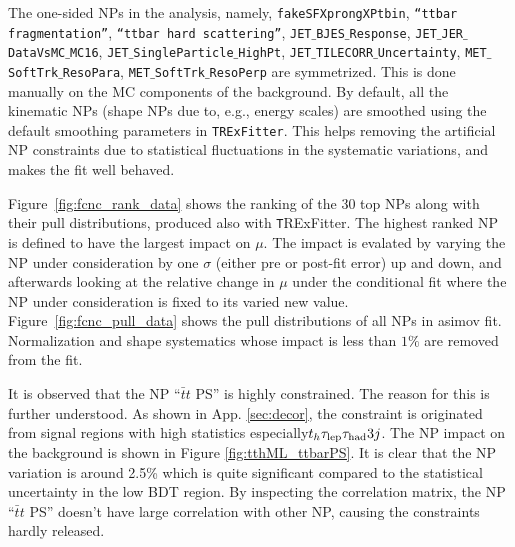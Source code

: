 The one-sided NPs in the analysis, namely, \texttt{fakeSFXprongXPtbin}, \texttt{``ttbar fragmentation''}, \texttt{``ttbar hard scattering''}, \texttt{JET$\_$BJES$\_$Response}, \texttt{JET$\_$JER$\_$DataVsMC$\_$MC16}, \texttt{JET$\_$SingleParticle$\_$HighPt}, \texttt{JET$\_$TILECORR$\_$Uncertainty}, \texttt{MET$\_$SoftTrk$\_$ResoPara}, \texttt{MET$\_$SoftTrk$\_$ResoPerp} are symmetrized. This is done manually on the MC components of the background. By default, all the kinematic NPs (shape NPs due to, e.g., energy scales) are smoothed using the default smoothing parameters in \texttt{TRExFitter}. This helps removing the artificial NP constraints due to statistical fluctuations in the systematic variations, and makes the fit well behaved. %

Figure~\ref{fig:fcnc_rank_data} shows the ranking of the 30 top NPs along with their pull distributions, produced also with {\texttt TRExFitter}. The highest ranked NP is defined to have the largest impact on $\mu$. The impact is evalated by varying the NP under consideration by one $\sigma$ (either pre or post-fit error) up and down, and afterwards looking at the relative change in $\mu$ under the conditional fit where the NP under consideration is fixed to its varied new value.
Figure~\ref{fig:fcnc_pull_data} shows the pull distributions of all NPs in asimov fit. %
Normalization and shape systematics whose impact is less than $1\%$ are removed from the fit. %

It is observed that the NP ``$\bar{t}t$ PS'' is highly constrained. The reason for this is further understood. As shown in App. \ref{sec:decor}, the constraint is originated from signal regions with high statistics especially$t_h\tau_\text{lep}{}\tau_\text{had} 3j$. The NP impact on the background is shown in Figure \ref{fig:tthML_ttbarPS}. It is clear that the NP variation is around 2.5\% which is quite significant compared to the statistical uncertainty in the low BDT region. By inspecting the correlation matrix, the NP ``$\bar{t}t$ PS'' doesn't have large correlation with other NP, causing the constraints hardly released.

